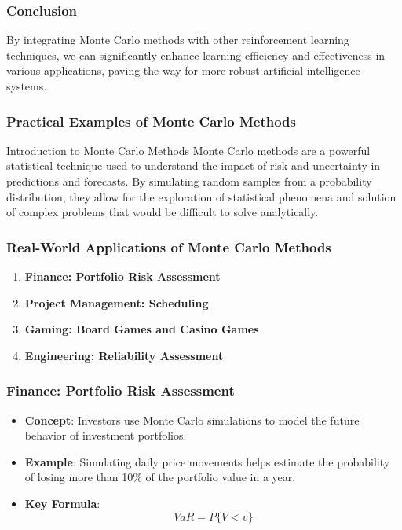 \documentclass[aspectratio=169]{beamer}
\begin{document}
\begin{frame}[fragile]
    \frametitle{Conclusion}
    By integrating Monte Carlo methods with other reinforcement learning techniques, we can significantly enhance learning efficiency and effectiveness in various applications, paving the way for more robust artificial intelligence systems.
\end{frame}

\begin{frame}[fragile]
    \frametitle{Practical Examples of Monte Carlo Methods}

    \begin{block}{Introduction to Monte Carlo Methods}
        Monte Carlo methods are a powerful statistical technique used to understand the impact of risk and uncertainty in predictions and forecasts. By simulating random samples from a probability distribution, they allow for the exploration of statistical phenomena and solution of complex problems that would be difficult to solve analytically.
    \end{block}
\end{frame}

\begin{frame}[fragile]
    \frametitle{Real-World Applications of Monte Carlo Methods}

    \begin{enumerate}
        \item \textbf{Finance: Portfolio Risk Assessment}
        \item \textbf{Project Management: Scheduling}
        \item \textbf{Gaming: Board Games and Casino Games}
        \item \textbf{Engineering: Reliability Assessment}
    \end{enumerate}
\end{frame}

\begin{frame}[fragile]
    \frametitle{Finance: Portfolio Risk Assessment}

    \begin{itemize}
        \item \textbf{Concept}: Investors use Monte Carlo simulations to model the future behavior of investment portfolios.
        \item \textbf{Example}: Simulating daily price movements helps estimate the probability of losing more than 10\% of the portfolio value in a year.
        \item \textbf{Key Formula}:
        \begin{equation}
            VaR = P\{V < v\}
        \end{equation}
        \end{itemize}
\end{frame}
\end{document}
